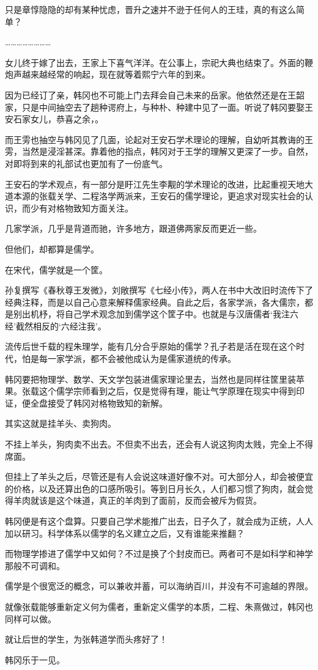 只是章惇隐隐的却有某种忧虑，晋升之速并不逊于任何人的王珪，真的有这么简单？

……………………

女儿终于嫁了出去，王家上下喜气洋洋。在公事上，宗祀大典也结束了。外面的鞭炮声越来越经常的响起，现在就等着熙宁六年的到来。

因为已经订了亲，韩冈也不可能上门去拜会自己未来的岳家。他依然还是在王韶家，只是中间抽空去了趟种谔府上，与种朴、种建中见了一面。听说了韩冈要娶王安石家女儿，恭喜之余，。

而王雱也抽空与韩冈见了几面，论起对王安石学术理论的理解，自幼听其教诲的王雱，当然是浸淫甚深。靠着他的指点，韩冈对于王学的理解又更深了一步。自然，对即将到来的礼部试也更加有了一份底气。

王安石的学术观点，有一部分是盱江先生李觏的学术理论的改进，比起重视天地大道本源的张载关学、二程洛学两派来，王安石的儒学理论，更追求对现实社会的认识，而少有对格物致知方面关注。

几家学派，几乎是背道而驰，许多地方，跟道佛两家反而更近一些。

但他们，却都算是儒学。

在宋代，儒学就是一个筐。

孙复撰写《春秋尊王发微》，刘敞撰写《七经小传》，两人在书中大改旧时流传下了经典注释，而是以自己心意来解释儒家经典。自此之后，各家学派，各大儒宗，都是别出机杼，将自己学术观念加到儒学这个筐子中。也就是与汉唐儒者‘我注六经’截然相反的‘六经注我’。

流传后世千载的程朱理学，能有几分合乎原始的儒学？孔子若是活在现在这个时代，怕是每一家学派，都不会被他成认为是儒家道统的传承。

韩冈要把物理学、数学、天文学包装进儒家理论里去，当然也是同样往筐里装苹果。张载这个儒学宗师看到之后，仅是觉得有理，能让气学原理在现实中得到印证，便全盘接受了韩冈对格物致知的新解。

其实这就是挂羊头、卖狗肉。

不挂上羊头，狗肉卖不出去。不但卖不出去，还会有人说这狗肉太贱，完全上不得席面。

但挂上了羊头之后，尽管还是有人会说这味道好像不对。可大部分人，却会被便宜的价格，以及还算出色的口感所吸引。等到日月长久，人们都习惯了狗肉，就会觉得羊肉就该是这个味道，真正的羊肉到了面前，反而会被斥为假货。

韩冈便是有这个盘算。只要自己学术能推广出去，日子久了，就会成为正统，人人加以研习。科学体系以儒学的名义建立之后，又有谁能来推翻？

而物理学掺进了儒学中又如何？不过是换了个封皮而已。两者可不是如科学和神学那般不可调和。

儒学是个很宽泛的概念，可以兼收并蓄，可以海纳百川，并没有不可逾越的界限。

就像张载能够重新定义何为儒者，重新定义儒学的本质，二程、朱熹做过，韩冈也同样可以做。

就让后世的学生，为张韩道学而头疼好了！

韩冈乐于一见。

